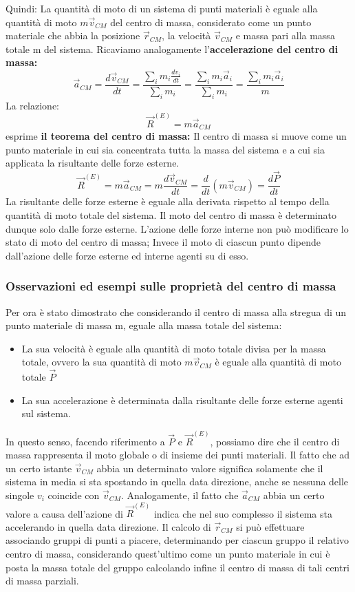 \documentclass{article}
\numberwithin{equation}{subsection}
\begin{document}
Quindi: La quantità di moto di un sistema di punti materiali è eguale alla quantità di moto $m\vec{v}_{CM}$ del centro di massa, considerato come un punto materiale che abbia la posizione $\vec{r}_{CM}$, la velocità $\vec{v}_{CM}$ e massa pari alla massa totale m del sistema. Ricaviamo analogamente l'\textbf{accelerazione del centro di massa:}
\begin{equation}
     \vec{a}_{CM}=\frac{d\vec{v}_{CM}}{dt}=\frac{\sum_im_i\frac{dv_i}{dt}}{\sum_im_i}=\frac{\sum_im_i\vec{a}_i}{\sum_im_i}=\frac{\sum_im_i\vec{a}_i}{m}
\end{equation}
La relazione:
\begin{equation}
    \vec{R}^{(E)}=m\vec{a}_{CM}
\end{equation}
esprime \textbf{il teorema del centro di massa:} Il centro di massa si muove come un punto materiale in cui sia concentrata tutta la massa del sistema e a cui sia applicata la risultante delle forze esterne.
\begin{equation}
    \vec{R}^{(E)}=m\vec{a}_{CM}=m\frac{d\vec{v}_{CM}}{dt}=\frac{d}{dt}(m\vec{v}_{CM})=\frac{d\vec{P}}{dt}
\end{equation}
La risultante delle forze esterne è eguale alla derivata rispetto al tempo della quantità di moto totale del sistema. Il moto del centro di massa è determinato dunque solo dalle forze esterne. L'azione delle forze interne non può modificare lo stato di moto del centro di massa; Invece il moto di ciascun punto dipende dall'azione delle forze esterne ed interne agenti su di esso.
\subsubsection{Osservazioni ed esempi sulle proprietà del centro di massa}
Per ora è stato dimostrato che considerando il centro di massa alla stregua di un punto materiale di massa m, eguale alla massa totale del sistema: \\
\begin{itemize}
    \item La sua velocità è eguale alla quantità di moto totale divisa per la massa totale, ovvero la sua quantità di moto $m\vec{v}_{CM}$ è eguale alla quantità di moto totale $\vec{P}$
    \item La sua accelerazione è determinata dalla risultante delle forze esterne agenti sul sistema. 
    \end{itemize}
In questo senso, facendo riferimento a $\vec{P}$ e $\vec{R}^{(E)}$, possiamo dire che il centro di massa rappresenta il moto globale o di insieme dei punti materiali. Il fatto che ad un certo istante $\vec{v}_{CM}$ abbia un determinato valore significa solamente che il sistema in media si sta spostando in quella data direzione, anche se nessuna delle singole $v_i$ coincide con $\vec{v}_{CM}$. Analogamente, il fatto che $\vec{a}_{CM}$ abbia un certo valore a causa dell'azione di $\vec{R}^{(E)}$ indica che nel suo complesso il sistema sta accelerando in quella data direzione. Il calcolo di $\vec{r}_{CM}$ si può effettuare associando gruppi di punti a piacere, determinando per ciascun gruppo il relativo centro di massa, considerando quest'ultimo come un punto materiale in cui è posta la massa totale del gruppo calcolando infine il centro di massa di tali centri di massa parziali.
\end{document}
